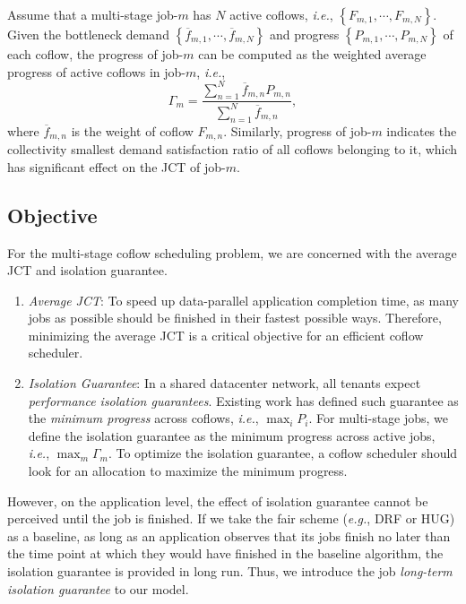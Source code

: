 \documentclass[10pt, conference, letterpaper]{IEEEtran}
\begin{document}
Assume that a multi-stage job-$m$ has $N$ active coflows, \emph{i.e.}, $\left\{F_{m,1},\cdots,F_{m,N}\right\}$. Given the bottleneck demand $\left\{\overline{f}_{m,1},\cdots,\overline{f}_{m,N}\right\}$ and progress $\left\{P_{m,1},\cdots,P_{m,N}\right\}$ of each coflow, the progress of job-$m$ can be computed as the weighted average progress of active coflows in job-$m$, \emph{i.e.},
\begin{equation}
	\Gamma_m = \frac{\sum_{n=1}^N \overline{f}_{m,n}P_{m,n}}{\sum_{n=1}^N \overline{f}_{m,n}},
\end{equation}
where $\overline{f}_{m,n}$ is the weight of coflow $F_{m,n}$. Similarly, progress of job-$m$ indicates the collectivity smallest demand satisfaction ratio of all coflows belonging to it, which has significant effect on the JCT of job-$m$.

\subsection{Objective}
For the multi-stage coflow  scheduling problem, we are concerned with the average JCT and isolation guarantee.

\begin{enumerate}
	\item \emph{Average JCT}: To speed up data-parallel application completion time, as many jobs as possible should be finished in their fastest possible ways. Therefore, minimizing the average JCT is a critical objective for an efficient coflow scheduler.
	\item \emph{Isolation Guarantee}: In a shared datacenter network, all tenants expect \emph{performance isolation guarantees}. Existing work has defined such guarantee as the \emph{minimum progress} across coflows\cite{HUG}, \emph{i.e.}, $\max_i P_i$. For multi-stage jobs, we define the isolation guarantee as the minimum progress across active jobs, \emph{i.e.}, $\max_m \Gamma_m$. To optimize the isolation guarantee, a coflow scheduler should look for an allocation to maximize the minimum progress.
\end{enumerate}

However, on the application level, the effect of isolation guarantee cannot be perceived until the job is finished. If we take the fair scheme (\emph{e.g.}, DRF\cite{DRF} or HUG\cite{HUG}) as a baseline, as long as an application observes that its jobs finish no later than the time point at which they would have finished in the baseline algorithm, the isolation guarantee is provided in long run. Thus, we introduce the job \emph{long-term isolation guarantee} to our model.
\end{document}
